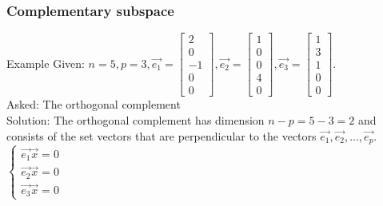 \begin{frame}
	\frametitle{Complementary subspace}
	\begin{block}{Example}
		Given: $n=5,p=3, \overrightarrow{e_1}=\begin{bmatrix} 2\\0\\-1\\0\\0 \end{bmatrix}, \overrightarrow{e_2}=\begin{bmatrix} 1\\0\\0\\4\\0 \end{bmatrix}, \overrightarrow{e_3}=\begin{bmatrix} 1\\3\\1\\0\\0 \end{bmatrix}$.\\
		Asked: The orthogonal complement\\
		Solution: The orthogonal complement has dimension $n-p=5-3=2$ and consists of the set vectors that are perpendicular to the vectors $\overrightarrow{e_1},\overrightarrow{e_2},...,\overrightarrow{e_p}$.\\
		$\begin{cases}
			\overrightarrow{e_1}\overrightarrow{x}=0\\
			\overrightarrow{e_2}\overrightarrow{x}=0\\
			\overrightarrow{e_3}\overrightarrow{x}=0
		\end{cases}$
	\end{block}
\end{frame}

